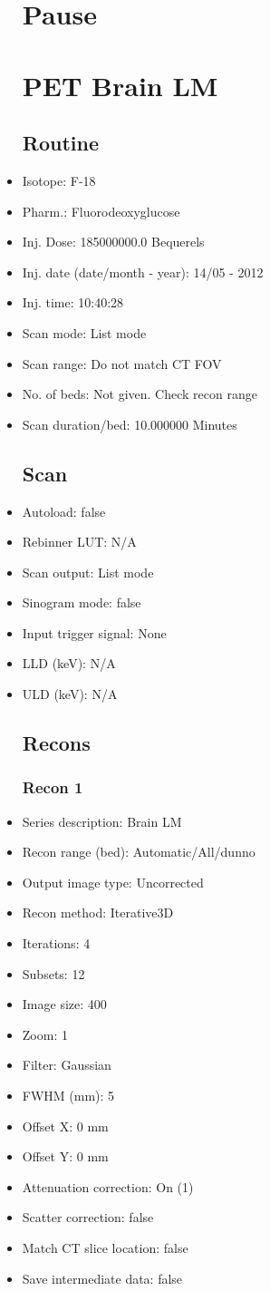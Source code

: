 \documentclass[12pt]{article}
\begin{document}
\begin{itemize}
\section{Pause}
\section{PET Brain LM}\subsection{Routine}
\item Isotope: F-18
\item Pharm.: Fluorodeoxyglucose
\item Inj. Dose: 185000000.0 Bequerels
\item Inj. date (date/month - year): 14/05 - 2012
\item Inj. time: 10:40:28
\item Scan mode: List mode
\item Scan range: Do not match CT FOV
\item No. of beds: Not given. Check recon range
\item Scan duration/bed: 10.000000 Minutes
\subsection{Scan}
\item Autoload: false
\item Rebinner LUT: N/A
\item Scan output: List mode
\item Sinogram mode: false
\item Input trigger signal: None
\item LLD (keV): N/A
\item ULD (keV): N/A
\subsection{Recons}
\subsubsection{Recon 1}
\item Series description: Brain LM
\item Recon range (bed): Automatic/All/dunno
\item Output image type: Uncorrected
\item Recon method: Iterative3D
\item Iterations: 4
\item Subsets: 12
\item Image size: 400
\item Zoom: 1
\item Filter: Gaussian
\item FWHM (mm): 5
\item Offset X: 0 mm
\item Offset Y: 0 mm
\item Attenuation correction: On (1)
\item Scatter correction: false
\item Match CT slice location: false
\item Save intermediate data: false
\end{itemize}
\end{document}
